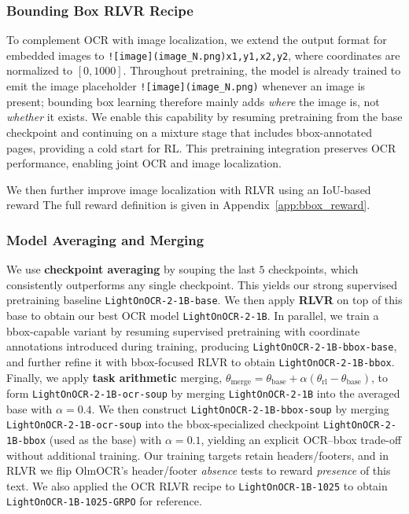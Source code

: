 \documentclass{article}
\begin{document}
\subsubsection{Bounding Box RLVR Recipe}
\label{sec:bbox_rlvr}
To complement OCR with image localization, we extend the output format for embedded images to
\texttt{![image](image\_N.png)x1,y1,x2,y2}, where coordinates are normalized to $[0,1000]$. Throughout pretraining, the model is already trained to emit the image placeholder \texttt{![image](image\_N.png)} whenever an image is present; bounding box learning therefore mainly adds \emph{where} the image is, not \emph{whether} it exists. We enable this capability by resuming pretraining from the base checkpoint and continuing on a mixture stage that includes bbox-annotated pages, providing a cold start for RL. This pretraining integration preserves OCR performance, enabling joint OCR and image localization.

We then further improve image localization with RLVR using an IoU-based reward The full reward definition is given in Appendix~\ref{app:bbox_reward}.

\subsubsection{Model Averaging and Merging}
We use \textbf{checkpoint averaging} by souping the last $5$ checkpoints, which consistently outperforms any single checkpoint. This yields our strong supervised pretraining baseline \texttt{LightOnOCR-2-1B-base}. We then apply \textbf{RLVR} on top of this base to obtain our best OCR model \texttt{LightOnOCR-2-1B}. In parallel, we train a bbox-capable variant by resuming supervised pretraining with coordinate annotations introduced during training, producing \texttt{LightOnOCR-2-1B-bbox-base}, and further refine it with bbox-focused RLVR to obtain \texttt{LightOnOCR-2-1B-bbox}. Finally, we apply \textbf{task arithmetic} merging,
$\theta_{\text{merge}}=\theta_{\text{base}}+\alpha(\theta_{\text{rl}}-\theta_{\text{base}})$,
to form \texttt{LightOnOCR-2-1B-ocr-soup} by merging \texttt{LightOnOCR-2-1B} into the averaged base with $\alpha=0.4$. We then construct \texttt{LightOnOCR-2-1B-bbox-soup} by merging \texttt{LightOnOCR-2-1B-ocr-soup} into the bbox-specialized checkpoint \texttt{LightOnOCR-2-1B-bbox} (used as the base) with $\alpha=0.1$, yielding an explicit OCR--bbox trade-off without additional training. Our training targets retain headers/footers, and in RLVR we flip OlmOCR's header/footer \emph{absence} tests to reward \emph{presence} of this text. We also applied the OCR RLVR recipe to \texttt{LightOnOCR-1B-1025} to obtain \texttt{LightOnOCR-1B-1025-GRPO} for reference.
\end{document}
